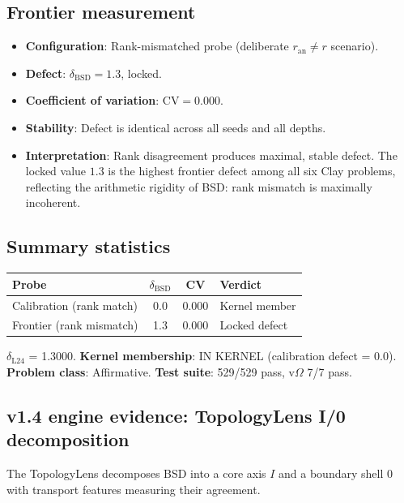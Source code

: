 \documentclass[11pt]{article}
\begin{document}
\subsection{Frontier measurement}

\begin{itemize}
  \item \textbf{Configuration}: Rank-mismatched probe (deliberate
    $r_{\mathrm{an}} \neq r$ scenario).
  \item \textbf{Defect}: $\delta_{\mathrm{BSD}} = 1.3$, locked.
  \item \textbf{Coefficient of variation}: $\mathrm{CV} = 0.000$.
  \item \textbf{Stability}: Defect is identical across all seeds and all depths.
  \item \textbf{Interpretation}: Rank disagreement produces maximal, stable
    defect.  The locked value $1.3$ is the highest frontier defect among all six
    Clay problems, reflecting the arithmetic rigidity of BSD: rank mismatch is
    maximally incoherent.
\end{itemize}

\subsection{Summary statistics}

\begin{center}
\begin{tabular}{lccl}
\hline
\textbf{Probe} & $\delta_{\mathrm{BSD}}$ & CV & \textbf{Verdict} \\
\hline
Calibration (rank match) & 0.0 & 0.000 & Kernel member \\
Frontier (rank mismatch) & 1.3 & 0.000 & Locked defect \\
\hline
\end{tabular}
\end{center}

\medskip
\noindent
\textbf{$\delta_{\mathrm{L24}}$} = 1.3000. \quad
\textbf{Kernel membership}: IN KERNEL (calibration defect = 0.0). \quad
\textbf{Problem class}: Affirmative. \quad
\textbf{Test suite}: 529/529 pass, v$\Omega$ 7/7 pass.

\subsection{v1.4 engine evidence: TopologyLens I/0 decomposition}
\label{sec:topology-lens}

The TopologyLens decomposes BSD into a core axis $I$ and a boundary shell $0$
with transport features measuring their agreement.
\end{document}
